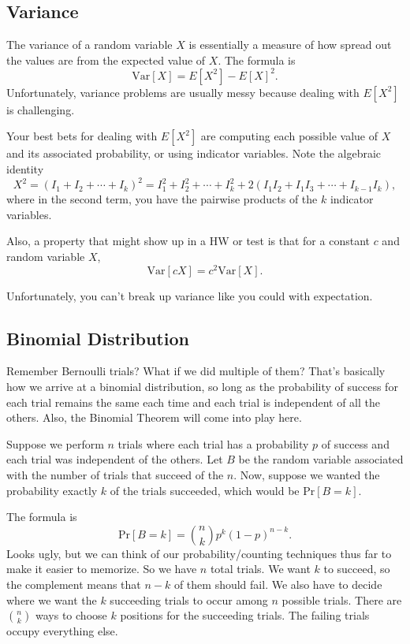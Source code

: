 \documentclass[11pt]{scrartcl}
\begin{document}
\subsection{Variance}

The variance of a random variable $X$ is essentially a measure of how spread out the values are from the expected value of $X$. The formula is \[\text{Var}[X] = E[X^2] - E[X]^2.\] Unfortunately, variance problems are usually messy because dealing with $E[X^2]$ is challenging.

\begin{advice}
Your best bets for dealing with $E[X^2]$ are computing each possible value of $X$ and its associated probability, or using indicator variables. Note the algebraic identity \[X^2 = (I_1 + I_2 + \cdots + I_k)^2 = I_1^2 + I_2^2 + \cdots + I_k^2 + 2(I_1I_2 + I_1I_3 + \cdots + I_{k-1}I_k),\] where in the second term, you have the pairwise products of the $k$ indicator variables.
\end{advice}

Also, a property that might show up in a HW or test is that for a constant $c$ and random variable $X$, \[\text{Var}[cX] = c^2\text{Var}[X].\]

Unfortunately, you can't break up variance like you could with expectation.

\subsection{Binomial Distribution}

Remember Bernoulli trials? What if we did multiple of them? That's basically how we arrive at a binomial distribution, so long as the probability of success for each trial remains the same each time and each trial is independent of all the others. Also, the Binomial Theorem will come into play here.

Suppose we perform $n$ trials where each trial has a probability $p$ of success and each trial was independent of the others. Let $B$ be the random variable associated with the number of trials that succeed of the $n$. Now, suppose we wanted the probability exactly $k$ of the trials succeeded, which would be $\text{Pr}[B = k]$.

The formula is \[\text{Pr}[B = k] = \binom{n}{k}p^k(1-p)^{n-k}.\] Looks ugly, but we can think of our probability/counting techniques thus far to make it easier to memorize. So we have $n$ total trials. We want $k$ to succeed, so the complement means that $n - k$ of them should fail. We also have to decide where we want the $k$ succeeding trials to occur among $n$ possible trials. There are $\binom{n}{k}$ ways to choose $k$ positions for the succeeding trials. The failing trials occupy everything else. 
\end{document}
